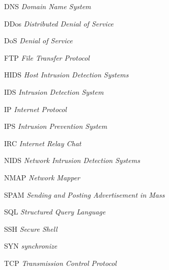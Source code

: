 \begin{siglas}
	\item[DNS] \textit{Domain Name System}
	\item[DDos] \textit{Distributed Denial of Service}
	\item[DoS] \textit{Denial of Service}
	\item[FTP] \textit{File Transfer Protocol}
	\item[HIDS] \textit{Host Intrusion Detection Systems}
	\item[IDS] \textit{Intrusion Detection System}
	\item[IP] \textit{Internet Protocol}
	\item[IPS] \textit{Intrusion Prevention System}
	\item[IRC] \textit{Internet Relay Chat}
	\item[NIDS] \textit{Network Intrusion Detection Systems}
	\item[NMAP] \textit{Network Mapper}
	\item[SPAM] \textit{Sending and Posting Advertisement in Mass}
	\item[SQL] \textit{Structured Query Language}
	\item[SSH] \textit{Secure Shell}
	\item[SYN] \textit{synchronize}
	\item[TCP] \textit{Transmission Control Protocol}

	

\end{siglas}
